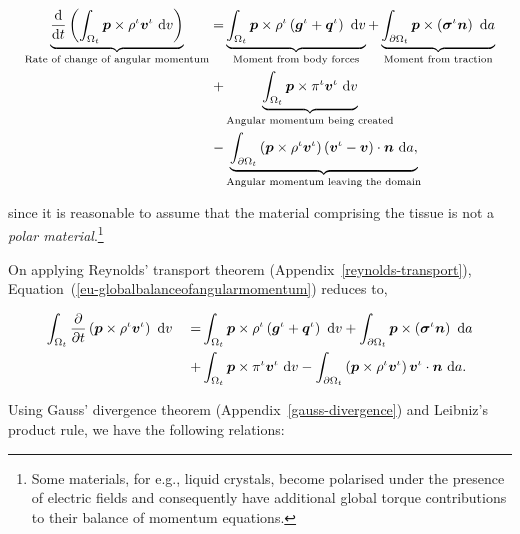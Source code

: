 \begin{equation}
\begin{split}
\underbrace{\frac{\mathrm{d}}{\mathrm{d}t}\left(\int_{\Omega_{t}} \mbox{\boldmath$ p$}
  \times \rho^{\iota} \mbox{\boldmath$ v$}^{\iota}\ \mathrm{d}v\right)}_{\text{Rate of
    change of angular momentum}} = & \underbrace{\int_{\Omega_{t}} \mbox{\boldmath$ p$}
  \times \rho^{\iota} \left(\mbox{\boldmath$ g$}^{\iota} +
  \mbox{\boldmath$ q$}^{\iota}\right)\ \mathrm{d}v}_{\text{Moment from body forces}} +
\underbrace{\int_{\partial \Omega_{t}} \mbox{\boldmath$ p$} \times
  \left(\mbox{\boldmath$\sigma$}^{\iota}\mbox{\boldmath$ n$}\right)\ \mathrm{d}a}_{\text{Moment
    from traction}}\\ + & \underbrace{\int_{\Omega_{t}} \mbox{\boldmath$ p$} \times
  \pi^{\iota}\mbox{\boldmath$ v$}^{\iota}\ \mathrm{d}v}_{\text{Angular momentum being
    created}} \\ - & \underbrace{\int_{\partial \Omega_{t}} \left(\mbox{\boldmath$ p$}
  \times \rho^{\iota} \mbox{\boldmath$ v$}^{\iota}\right) \left(\mbox{\boldmath$ v$}^{\iota} -
  \mbox{\boldmath$ v$}\right) \cdot \mbox{\boldmath$ n$}\ \mathrm{d}a,}_{\text{Angular momentum leaving
    the domain}}
\end{split}
\label{eu-globalbalanceofangularmomentum}
\end{equation}

\noindent since it is reasonable to assume that the material
comprising the tissue is not a {\em polar material}.\footnote{Some
  materials, for e.g., liquid crystals, become polarised under the
  presence of electric fields and consequently have additional global
  torque contributions to their balance of momentum equations.}

On applying Reynolds' transport theorem
(Appendix~\ref{reynolds-transport}),
Equation~(\ref{eu-globalbalanceofangularmomentum}) reduces to,

\begin{equation*}
\begin{split}
\int_{\Omega_{t}} \frac{\partial}{\partial t}\left( \mbox{\boldmath$ p$} \times \rho^{\iota}
  \mbox{\boldmath$ v$}^{\iota}\right)\ \mathrm{d}v \quad =
& \int_{\Omega_{t}} \mbox{\boldmath$ p$} \times \rho^{\iota} \left(\mbox{\boldmath$ g$}^{\iota} +
  \mbox{\boldmath$ q$}^{\iota}\right)\ \mathrm{d}v
+ \int_{\partial \Omega_{t}}
  \mbox{\boldmath$ p$} \times \left(\mbox{\boldmath$\sigma$}^{\iota}\mbox{\boldmath$ n$}\right)\ \mathrm{d}a\\
+ & \int_{\Omega_{t}} \mbox{\boldmath$ p$} \times 
  \pi^{\iota}\mbox{\boldmath$ v$}^{\iota}\ \mathrm{d}v - \int_{\partial \Omega_{t}} \left(\mbox{\boldmath$ p$}
  \times \rho^{\iota} 
  \mbox{\boldmath$ v$}^{\iota}\right) \mbox{\boldmath$ v$}^{\iota} \cdot \mbox{\boldmath$ n$}\ \mathrm{d}a.
\end{split}
\end{equation*}

Using Gauss' divergence theorem (Appendix~\ref{gauss-divergence}) and
Leibniz's product rule, we have the following relations:

